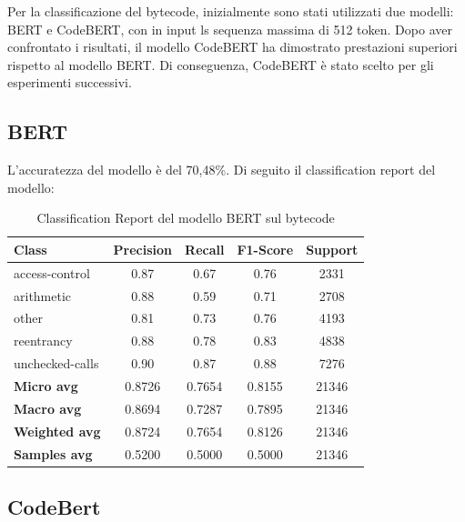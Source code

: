 \documentclass[../../Thesis.tex]{subfiles}
\begin{document}
Per la classificazione del bytecode, inizialmente sono stati utilizzati due modelli: BERT e CodeBERT, con in input ls sequenza massima di 512 token. Dopo aver confrontato i risultati, il modello CodeBERT ha dimostrato prestazioni superiori rispetto al modello BERT. Di conseguenza, CodeBERT è stato scelto per gli esperimenti successivi.
\subsection{BERT}
L'accuratezza del modello è del 70,48\%. Di seguito il classification report del modello:
\begin{table}[H]
\centering
\small
\begin{tabular}{lcccc}
\hline
\textbf{Class} & \textbf{Precision} & \textbf{Recall} & \textbf{F1-Score} & \textbf{Support} \\
\hline
access-control & 0.87 & 0.67 & 0.76 & 2331 \\
arithmetic & 0.88 & 0.59 & 0.71 & 2708 \\
other & 0.81 & 0.73 & 0.76 & 4193 \\
reentrancy & 0.88 & 0.78 & 0.83 & 4838 \\
unchecked-calls & 0.90 & 0.87 & 0.88 & 7276 \\
\hline
\textbf{Micro avg} & 0.8726 & 0.7654 & 0.8155 & 21346 \\
\textbf{Macro avg} & 0.8694 & 0.7287 & 0.7895 & 21346 \\
\textbf{Weighted avg} & 0.8724 & 0.7654 & 0.8126 & 21346 \\
\textbf{Samples avg} & 0.5200 & 0.5000 & 0.5000 & 21346 \\
\hline
\end{tabular}
\caption{Classification Report del modello BERT sul bytecode}
\end{table}

\subsection{CodeBert}
\end{document}
